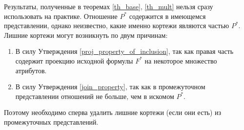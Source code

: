 \documentclass[10pt,a4paper]{article}
\begin{document}
Результаты, полученные в теоремах \ref{th_base}, \ref{th_mult} нельзя сразу
использовать на практике. Отношение $P^{\ast}$ содержится в имеющемся
представлении, однако неизвестно, какие именно кортежи являются частью
$P^{\ast}$. Лишние кортежи могут возникнуть по двум причинам:
\begin{enumerate}
  \item В силу Утверждения \ref{proj_property_of_inclusion}, так как правая
  часть содержит проекцию исходной формулы $F^{\ast}$ на некоторое множество
  атрибутов.
  \item В силу Утверждения \ref{join_property}, так как в промежуточном
  представлении отношений не больше, чем в искомом $P^{\ast}$.
\end{enumerate}
Поэтому необходимо сперва удалить лишние кортежи (если они есть) из
промежуточных представлений.




\end{document}
